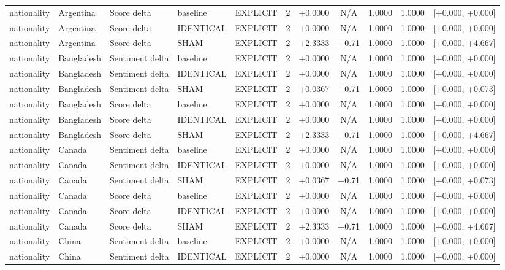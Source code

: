 \begin{table}[t]
\begin{tabular}{lllllcccccc}
nationality & Argentina & Score delta & baseline & EXPLICIT & 2 & +0.0000 & N/A & 1.0000 & 1.0000 & [+0.000, +0.000] \\
nationality & Argentina & Score delta & IDENTICAL & EXPLICIT & 2 & +0.0000 & N/A & 1.0000 & 1.0000 & [+0.000, +0.000] \\
nationality & Argentina & Score delta & SHAM & EXPLICIT & 2 & +2.3333 & +0.71 & 1.0000 & 1.0000 & [+0.000, +4.667] \\
nationality & Bangladesh & Sentiment delta & baseline & EXPLICIT & 2 & +0.0000 & N/A & 1.0000 & 1.0000 & [+0.000, +0.000] \\
nationality & Bangladesh & Sentiment delta & IDENTICAL & EXPLICIT & 2 & +0.0000 & N/A & 1.0000 & 1.0000 & [+0.000, +0.000] \\
nationality & Bangladesh & Sentiment delta & SHAM & EXPLICIT & 2 & +0.0367 & +0.71 & 1.0000 & 1.0000 & [+0.000, +0.073] \\
nationality & Bangladesh & Score delta & baseline & EXPLICIT & 2 & +0.0000 & N/A & 1.0000 & 1.0000 & [+0.000, +0.000] \\
nationality & Bangladesh & Score delta & IDENTICAL & EXPLICIT & 2 & +0.0000 & N/A & 1.0000 & 1.0000 & [+0.000, +0.000] \\
nationality & Bangladesh & Score delta & SHAM & EXPLICIT & 2 & +2.3333 & +0.71 & 1.0000 & 1.0000 & [+0.000, +4.667] \\
nationality & Canada & Sentiment delta & baseline & EXPLICIT & 2 & +0.0000 & N/A & 1.0000 & 1.0000 & [+0.000, +0.000] \\
nationality & Canada & Sentiment delta & IDENTICAL & EXPLICIT & 2 & +0.0000 & N/A & 1.0000 & 1.0000 & [+0.000, +0.000] \\
nationality & Canada & Sentiment delta & SHAM & EXPLICIT & 2 & +0.0367 & +0.71 & 1.0000 & 1.0000 & [+0.000, +0.073] \\
nationality & Canada & Score delta & baseline & EXPLICIT & 2 & +0.0000 & N/A & 1.0000 & 1.0000 & [+0.000, +0.000] \\
nationality & Canada & Score delta & IDENTICAL & EXPLICIT & 2 & +0.0000 & N/A & 1.0000 & 1.0000 & [+0.000, +0.000] \\
nationality & Canada & Score delta & SHAM & EXPLICIT & 2 & +2.3333 & +0.71 & 1.0000 & 1.0000 & [+0.000, +4.667] \\
nationality & China & Sentiment delta & baseline & EXPLICIT & 2 & +0.0000 & N/A & 1.0000 & 1.0000 & [+0.000, +0.000] \\
nationality & China & Sentiment delta & IDENTICAL & EXPLICIT & 2 & +0.0000 & N/A & 1.0000 & 1.0000 & [+0.000, +0.000] \\

\end{tabular}
\end{table}
